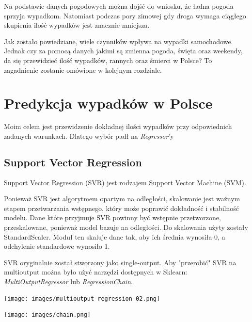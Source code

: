 \documentclass{article}
\begin{document}
Na podstawie danych pogodowych można dojść do wniosku, że ładna pogoda sprzyja wypadkom. Natomiast podczas pory zimowej gdy droga wymaga ciągłego skupienia ilość wypadków jest znacznie mniejsza.

Jak zostało powiedziane, wiele czynników wpływa na wypadki samochodowe. Jednak czy za pomocą danych jakimi są zmienna pogoda, święta oraz weekendy, da się przewidzieć ilość wypadków, rannych oraz śmierci w Polsce?
To zagadnienie zostanie omówione w kolejnym rozdziale.

\section{Predykcja wypadków w Polsce}

Moim celem jest przewidzenie dokładnej ilości wypadków przy odpowiednich zadanych warunkach. Dlatego wybór padł na \textit{Regressor}'y

\subsection{Support Vector Regression}
Support Vector Regression (SVR) jest rodzajem Support Vector Machine (SVM). 

Ponieważ SVR jest algorytmem opartym na odległości, skalowanie jest ważnym etapem przetwarzania wstępnego, który może poprawić dokładność i stabilność modelu.
Dane które przyjmuje SVR powinny być wstępnie przetworzone, przeskalowane, ponieważ model bazuje na odległości. Do skalowania użyty zostały StandardScaler. Moduł ten  skaluje dane tak, aby ich średnia wynosiła 0, a odchylenie standardowe wynosiło 1.

SVR oryginalnie został stworzony jako single-output. Aby "przerobić" SVR na multioutput można było użyć narzędzi dostępnych w Sklearn: \textit{MultiOutputRegressor} lub \textit{RegressionChain}.

 \begin{center}
    \texttt{[image: images/multioutput-regression-02.png]}
    \captionsetup{hypcap=false}
    \label{fig:multioutput}
\end{center}
\begin{center}
    \texttt{[image: images/chain.png]}
    \captionsetup{hypcap=false}
    \label{fig:chain}
\end{center}
\end{document}
